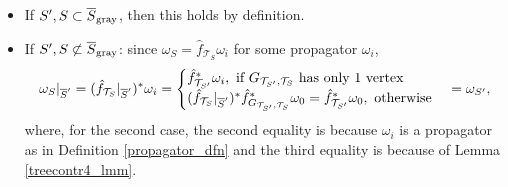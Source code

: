 \documentclass[11pt]{article}
\theoremstyle{definition}
\theoremstyle{remark}
\def\ov#1{\overline{#1}}
\def\sgray{{\textnormal{gray}}}
\def\cT{\mathcal{T}}
\def\tn#1{\textnormal{#1}}
\begin{document}
\begin{itemize}
\item If $S',S\subset\ov{S}_{\sgray}$, then this holds by definition. 

\item 
If $S',S\not\subset\ov{S}_{\sgray}$: since $\omega_S=\hat{f}_{\cT_S}\omega_i$ for some propagator $\omega_i$, 
$$\omega_S|_{\ov{S}'}=(\hat{f}_{\cT_S}|_{\ov{S}'})^*\omega_i=
\begin{cases}
\hat{f}_{\cT_{S'}}^*\omega_{i}, 
\tn{ if } G_{\cT_{S'},\cT_S} \tn{ has only 1 vertex}
\\
(\hat{f}_{\cT_S}|_{\ov{S}'})^*\hat{f}_{G_{\cT_{S'},\cT_S}}^*\omega_0=\hat{f}_{\cT_{S'}}^*\omega_{0}, \tn{ otherwise}
\end{cases}
=\omega_{S'},$$
where, for the second case, the second equality is because $\omega_i$ is a propagator as in Definition \ref{propagator_dfn} and the third equality is because of Lemma \ref{treecontr4_lmm}. 


\end{itemize}
\end{document}
